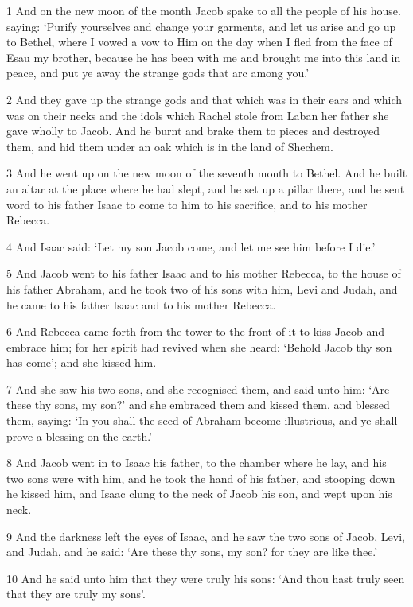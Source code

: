 \par 1 And on the new moon of the month Jacob spake to all the people of his house. saying: ‘Purify yourselves and change your garments, and let us arise and go up to Bethel, where I vowed a vow to Him on the day when I fled from the face of Esau my brother, because he has been with me and brought me into this land in peace, and put ye away the strange gods that arc among you.’
\par 2 And they gave up the strange gods and that which was in their ears and which was on their necks and the idols which Rachel stole from Laban her father she gave wholly to Jacob. And he burnt and brake them to pieces and destroyed them, and hid them under an oak which is in the land of Shechem.
\par 3 And he went up on the new moon of the seventh month to Bethel. And he built an altar at the place where he had slept, and he set up a pillar there, and he sent word to his father Isaac to come to him to his sacrifice, and to his mother Rebecca.
\par 4 And Isaac said: ‘Let my son Jacob come, and let me see him before I die.’
\par 5 And Jacob went to his father Isaac and to his mother Rebecca, to the house of his father Abraham, and he took two of his sons with him, Levi and Judah, and he came to his father Isaac and to his mother Rebecca.
\par 6 And Rebecca came forth from the tower to the front of it to kiss Jacob and embrace him; for her spirit had revived when she heard: ‘Behold Jacob thy son has come’; and she kissed him.
\par 7 And she saw his two sons, and she recognised them, and said unto him: ‘Are these thy sons, my son?’ and she embraced them and kissed them, and blessed them, saying: ‘In you shall the seed of Abraham become illustrious, and ye shall prove a blessing on the earth.’
\par 8 And Jacob went in to Isaac his father, to the chamber where he lay, and his two sons were with him, and he took the hand of his father, and stooping down he kissed him, and Isaac clung to the neck of Jacob his son, and wept upon his neck.
\par 9 And the darkness left the eyes of Isaac, and he saw the two sons of Jacob, Levi, and Judah, and he said: ‘Are these thy sons, my son? for they are like thee.’
\par 10 And he said unto him that they were truly his sons: ‘And thou hast truly seen that they are truly my sons’.

